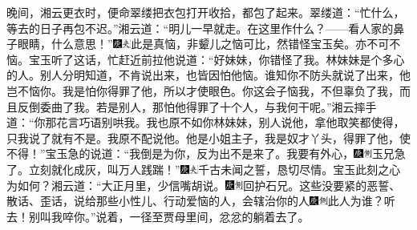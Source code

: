 晚间，湘云更衣时，便命翠缕把衣包打开收拾，都包了起来。翠缕道：“忙什么，等去的日子再包不迟。”湘云道：“明儿一早就走。在这里作什么？------看人家的鼻子眼睛，什么意思！”{\includegraphics[width=3mm]{../Images/00004}\includegraphics[width=3mm]{../Images/00012}\footnotesize \kaishu 此是真恼，非颦儿之恼可比，然错怪宝玉矣。亦不可不恼。}宝玉听了这话，忙赶近前拉他说道：“好妹妹，你错怪了我。林妹妹是个多心的人。别人分明知道，不肯说出来，也皆因怕他恼。谁知你不防头就说了出来，他岂不恼你。我是怕你得罪了他，所以才使眼色。你这会子恼我，不但辜负了我，而且反倒委曲了我。若是别人，那怕他得罪了十个人，与我何干呢。”湘云摔手道：“你那花言巧语别哄我。我也原不如你林妹妹，别人说他，拿他取笑都使得，只我说了就有不是。我原不配说他。他是小姐主子，我是奴才丫头，得罪了他，使不得！”宝玉急的说道：“我倒是为你，反为出不是来了。我要有外心，{\includegraphics[width=3mm]{../Images/00004}\includegraphics[width=3mm]{../Images/00011}\footnotesize \kaishu 玉兄急了。}立刻就化成灰，叫万人践踹！”{\includegraphics[width=3mm]{../Images/00004}\includegraphics[width=3mm]{../Images/00012}\footnotesize \kaishu 千古未闻之誓，恳切尽情。宝玉此刻之心为如何？}湘云道：“大正月里，少信嘴胡说。{\includegraphics[width=3mm]{../Images/00004}\includegraphics[width=3mm]{../Images/00011}\footnotesize \kaishu 回护石兄。}这些没要紧的恶誓、散话、歪话，说给那些小性儿、行动爱恼的人，会辖治你的人{\includegraphics[width=3mm]{../Images/00004}\includegraphics[width=3mm]{../Images/00011}\footnotesize \kaishu 此人为谁？}听去！别叫我啐你。”说着，一径至贾母里间，忿忿的躺着去了。

